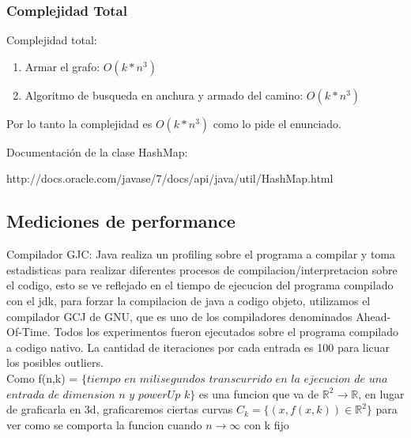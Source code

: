  \subsubsection{Complejidad Total}

 Complejidad total:
\begin{enumerate}

\item Armar el grafo: $O(k*n^3)$
\item Algoritmo de busqueda en anchura y armado del camino: $O(k*n^3)$
 \end{enumerate}
\vspace{2mm}
 Por lo tanto la complejidad es $O(k*n^3)$ como lo pide el enunciado.

\vspace{2mm}

Documentaci\'on de la clase HashMap:

 http://docs.oracle.com/javase/7/docs/api/java/util/HashMap.html


\subsection{Mediciones de performance} \label{ej_3:performance}

Compilador GJC: Java realiza un profiling sobre el programa a compilar y toma estadisticas para realizar diferentes procesos de compilacion/interpretacion sobre el codigo, esto se ve reflejado en el tiempo de ejecucion del programa compilado con el jdk, para forzar la compilacion de java a codigo objeto, utilizamos el compilador GCJ de GNU, que es uno de los compiladores denominados Ahead-Of-Time. Todos los experimentos fueron ejecutados sobre el programa compilado a codigo nativo. La cantidad de iteraciones por cada entrada es 100 para licuar los posibles outliers.\\

Como f(n,k) = $\{tiempo$ $en$ $milisegundos$ $transcurrido$ $en$ $la$ $ejecucion$ $de$ $una$ $entrada$ $de$ $dimension$ $n$ $y$ $powerUp$ $k\}$ es una funcion que va de $\mathbb{R}^2 \rightarrow \mathbb{R}$, en lugar de graficarla en 3d, graficaremos ciertas curvas $C_k = \{ (x, f(x, k)) \in \mathbb{R}^2 \}$ para ver como se comporta la funcion cuando $n \rightarrow \infty$ con k fijo

